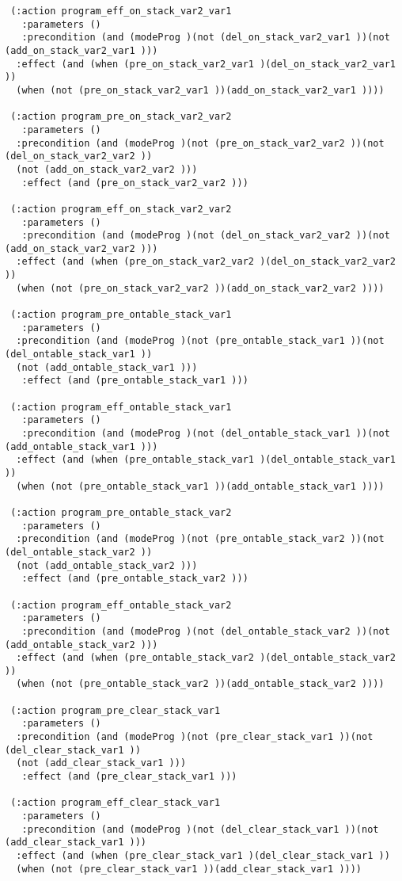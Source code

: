 \begin{scriptsize}
\begin{verbatim}
 (:action program_eff_on_stack_var2_var1
   :parameters ()
   :precondition (and (modeProg )(not (del_on_stack_var2_var1 ))(not (add_on_stack_var2_var1 )))
  :effect (and (when (pre_on_stack_var2_var1 )(del_on_stack_var2_var1 ))
  (when (not (pre_on_stack_var2_var1 ))(add_on_stack_var2_var1 ))))

 (:action program_pre_on_stack_var2_var2
   :parameters ()
  :precondition (and (modeProg )(not (pre_on_stack_var2_var2 ))(not (del_on_stack_var2_var2 ))
  (not (add_on_stack_var2_var2 )))
   :effect (and (pre_on_stack_var2_var2 )))

 (:action program_eff_on_stack_var2_var2
   :parameters ()
   :precondition (and (modeProg )(not (del_on_stack_var2_var2 ))(not (add_on_stack_var2_var2 )))
  :effect (and (when (pre_on_stack_var2_var2 )(del_on_stack_var2_var2 ))
  (when (not (pre_on_stack_var2_var2 ))(add_on_stack_var2_var2 ))))

 (:action program_pre_ontable_stack_var1
   :parameters ()
  :precondition (and (modeProg )(not (pre_ontable_stack_var1 ))(not (del_ontable_stack_var1 ))
  (not (add_ontable_stack_var1 )))
   :effect (and (pre_ontable_stack_var1 )))

 (:action program_eff_ontable_stack_var1
   :parameters ()
   :precondition (and (modeProg )(not (del_ontable_stack_var1 ))(not (add_ontable_stack_var1 )))
  :effect (and (when (pre_ontable_stack_var1 )(del_ontable_stack_var1 ))
  (when (not (pre_ontable_stack_var1 ))(add_ontable_stack_var1 ))))

 (:action program_pre_ontable_stack_var2
   :parameters ()
  :precondition (and (modeProg )(not (pre_ontable_stack_var2 ))(not (del_ontable_stack_var2 ))
  (not (add_ontable_stack_var2 )))
   :effect (and (pre_ontable_stack_var2 )))

 (:action program_eff_ontable_stack_var2
   :parameters ()
   :precondition (and (modeProg )(not (del_ontable_stack_var2 ))(not (add_ontable_stack_var2 )))
  :effect (and (when (pre_ontable_stack_var2 )(del_ontable_stack_var2 ))
  (when (not (pre_ontable_stack_var2 ))(add_ontable_stack_var2 ))))

 (:action program_pre_clear_stack_var1
   :parameters ()
  :precondition (and (modeProg )(not (pre_clear_stack_var1 ))(not (del_clear_stack_var1 ))
  (not (add_clear_stack_var1 )))
   :effect (and (pre_clear_stack_var1 )))

 (:action program_eff_clear_stack_var1
   :parameters ()
   :precondition (and (modeProg )(not (del_clear_stack_var1 ))(not (add_clear_stack_var1 )))
  :effect (and (when (pre_clear_stack_var1 )(del_clear_stack_var1 ))
  (when (not (pre_clear_stack_var1 ))(add_clear_stack_var1 ))))


\end{verbatim}
\end{scriptsize}
